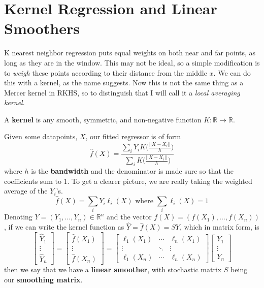 \section{Kernel Regression and Linear Smoothers} 

  K nearest neighbor regression puts equal weights on both near and far points, as long as they are in the window. This may not be ideal, so a simple modification is to \textit{weigh} these points according to their distance from the middle $x$. We can do this with a kernel, as the name suggests. Now this is not the same thing as a Mercer kernel in RKHS, so to distinguish that I will call it a \textit{local averaging kernel}. 

  \begin{definition}
    A \textbf{kernel} is any smooth, symmetric, and non-negative function $K : \mathbb{R} \to \mathbb{R}$.  
  \end{definition}

  \begin{definition}
    Given some datapoints, $X$, our fitted regressor is of form 
    \begin{equation}
      \hat{f} (X) = \frac{\sum_{i} Y_i K \bigg( \frac{||X - X_i||}{h} \bigg)}{\sum_{i} K \bigg( \frac{||X - X_i||}{h} \bigg)}
    \end{equation}
    where $h$ is the \textbf{bandwidth} and the denominator is made sure so that the coefficients sum to $1$. To get a clearer picture, we are really taking the weighted average of the $Y_i$'s. 
    \begin{equation}
      \hat{f} (X) = \sum_{i} Y_i \ell_i (X) \text{ where } \sum_{i} \ell_i (X) = 1
    \end{equation}
    Denoting $Y = (Y_1, \ldots, Y_n) \in \mathbb{R}^n$ and the vector $f(X) = (f(X_1), \ldots, f(X_n))$, if we can write the kernel function as $\hat{Y} = \hat{f}(X) = S Y$, which in matrix form, is 
    \begin{equation}
      \begin{bmatrix} \hat{Y}_1 \\ \vdots \\ \hat{Y}_n \end{bmatrix} = \begin{bmatrix} \hat{f}(X_1) \\ \vdots \\ \hat{f} (X_n) \end{bmatrix} = \begin{bmatrix} \ell_1 (X_1) & \cdots & \ell_n (X_1) \\ \vdots & \ddots & \vdots \\ \ell_1 (X_n) & \cdots & \ell_n (X_n) \end{bmatrix} \begin{bmatrix} Y_1 \\ \vdots \\ Y_n \end{bmatrix} 
    \end{equation}
    then we say that we have a \textbf{linear smoother}, with stochastic matrix $S$ being our \textbf{smoothing matrix}. 
  \end{definition}

